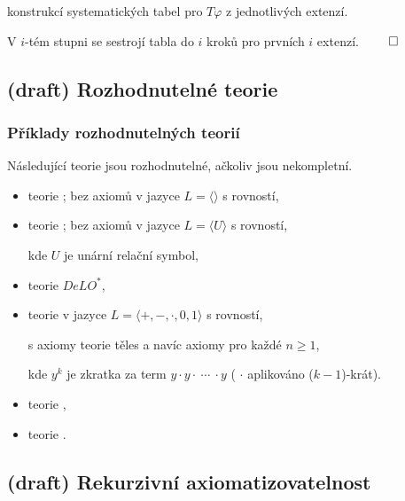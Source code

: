      konstrukcí systematických tabel pro $T\varphi$ z jednotlivých extenzí.
    \smallskip
    
    V $i$-tém stupni se sestrojí tabla do $i$ kroků pro prvních $i$ extenzí. $\qed$
    

\subsection{(draft) Rozhodnutelné teorie}\todo

\subsubsection*{Příklady rozhodnutelných teorií}
Následující teorie jsou rozhodnutelné, ačkoliv jsou nekompletní.
\smallskip

\begin{itemize}
\item teorie ; bez axiomů v jazyce $L=\langle \rangle$ s rovností,
\smallskip

\item teorie ; bez axiomů v jazyce $L=\langle U \rangle$ s rovností,
\smallskip

kde $U$ je unární relační symbol,
\smallskip

\item teorie  $DeLO^*$,
\smallskip

\item teorie  v jazyce $L=\langle +,-,\cdot,0,1\rangle$ s rovností,
\smallskip

s axiomy teorie těles a navíc axiomy pro každé $n\ge 1$,



kde $y^k$ je zkratka za term $y\cdot y \cdot\ \dotsb\ \cdot y$ ( $\cdot$ aplikováno ($k-1$)-krát).
\smallskip

\item teorie ,
\smallskip

\item teorie .
\end{itemize}


\subsection{(draft) Rekurzivní axiomatizovatelnost}\todo

